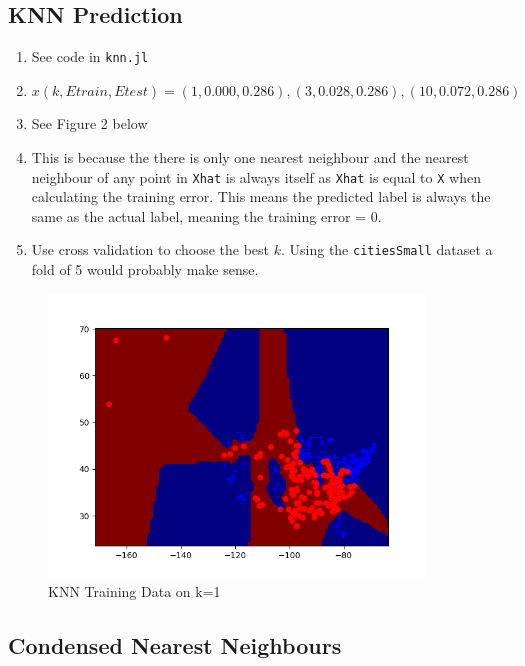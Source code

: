 \documentclass{article}
\def\enum#1{\begin{enumerate}#1\end{enumerate}}
\begin{document}
\subsection{KNN Prediction}

\enum{
	\item See code in \texttt{knn.jl}
	\item $x(k, Etrain, Etest) = (1, 0.000, 0.286), (3, 0.028, 0.286), (10, 0.072, 0.286)$
	\item See Figure 2 below
	\item This is because the there is only one nearest neighbour and the nearest neighbour of any point in \texttt{Xhat} is always itself as \texttt{Xhat} is equal to \texttt{X} when calculating the training error. This means the predicted label is always the same as the actual label, meaning the training error = 0.
	\item Use cross validation to choose the best $k$. Using the \texttt{citiesSmall} dataset a fold of 5 would probably make sense.
} 
\begin{figure}[h!]
  \includegraphics[height=7.5cm]{knn_train_data_k=1.png}
  \caption{KNN Training Data on k=1}
  \label{fig: knn}
\end{figure}

\subsection{Condensed Nearest Neighbours}
\end{document}
